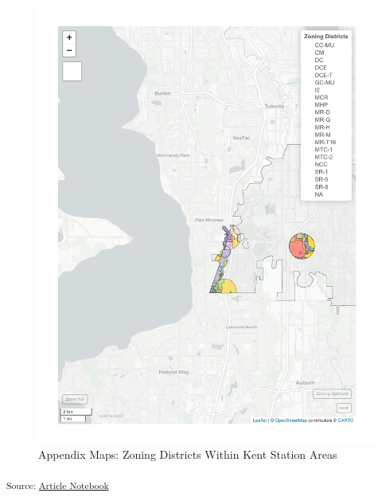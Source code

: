 \documentclass[
]{agujournal2019}
\begin{document}
\begin{figure}[H]

{\centering \includegraphics{index_files/figure-pdf/appendix-case-studies-kent-zoning-1.pdf}

}

\caption{Appendix Maps: Zoning Districts Within Kent Station Areas}

\end{figure}%

\textsubscript{Source:
\href{https://tiernanmartin.github.io/2024-transit-oriented-development-bill/index.qmd.html}{Article
Notebook}}
\end{document}

